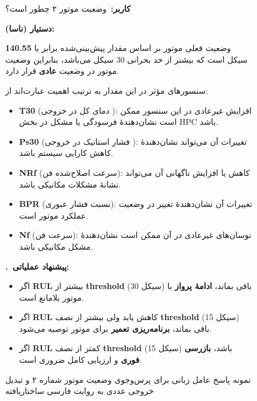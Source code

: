 \documentclass[a4paper,fleqn]{report}
\newcommand{\qaSection}[2]{%
  \vspace{6pt}%
  {\color{sectionColor}\textbf{#1.\ #2}}%
  \vspace{2pt}%
}
\begin{document}
\begin{figure}[h]
	\centering
	\begin{minipage}{0.95\textwidth}
		
		\begin{userBox}
			\textbf{کاربر:}\ وضعیت موتور ۲ چطور است؟
		\end{userBox}
		
		\begin{botBox}
			\textbf{دستیار (ناسا):}
			
			\medskip
			وضعیت فعلی موتور بر اساس مقدار پیش‌بینی‌شده
			برابر با \textbf{140.55} سیکل است که
			بیشتر از حد بحرانی 30 سیکل می‌باشد، بنابراین وضعیت موتور در وضعیت \textbf{عادی}
			قرار دارد.
			
			\medskip
			سنسورهای مؤثر در این مقدار
			به ترتیب اهمیت عبارت‌اند از:
			
			\begin{itemize}[rightmargin=1.5em, topsep=3pt, itemsep=4pt]
				\item \textbf{T30} (دمای کل در خروجی ): افزایش غیرعادی در این سنسور ممکن است
				نشان‌دهندهٔ فرسودگی یا مشکل در بخش HPC باشد.
				\item \textbf{Ps30} (فشار استاتیک در خروجی ): تغییرات آن می‌تواند نشان‌دهندهٔ
				کاهش کارایی سیستم باشد.
				\item \textbf{NRf} (سرعت اصلاح‌شده فن): کاهش یا افزایش ناگهانی آن می‌تواند نشانهٔ
				مشکلات مکانیکی باشد.
				\item \textbf{BPR} (نسبت فشار عبوری): تغییرات آن نشان‌دهندهٔ تغییر در وضعیت
				عملکرد موتور است.
				\item \textbf{Nf} (سرعت فن): نوسان‌های غیرعادی در آن ممکن است نشان‌دهندهٔ مشکل
				مکانیکی باشد.
			\end{itemize}
			
			\medskip
			\qaSection{}{پیشنهاد عملیاتی:}
			
			\begin{itemize}[rightmargin=1.5em, topsep=3pt, itemsep=4pt]
				\item اگر \textbf{RUL} بیشتر از \textbf{threshold} (سیکل 30) باقی بماند،
				\textbf{ادامهٔ پرواز} با موتور بلامانع است.
				\item اگر \textbf{RUL} کاهش یابد ولی بیشتر از نصف \textbf{threshold} (سیکل 15)
				باقی بماند، \textbf{برنامه‌ریزی تعمیر} برای موتور توصیه می‌شود.
				\item اگر \textbf{RUL} کمتر از نصف \textbf{threshold} (سیکل 15) باشد،
				\textbf{بازرسی فوری} و ارزیابی کامل ضروری است.
			\end{itemize}
			
		\end{botBox}
		
	\end{minipage}
	\caption{
		نمونه پاسخ عامل زبانی برای پرس‌وجوی وضعیت موتور شماره ۲ و تبدیل خروجی عددی به روایت فارسی ساختاریافته
		}
	\label{qa:llm-engine-query-2}
\end{figure}
\end{document}
